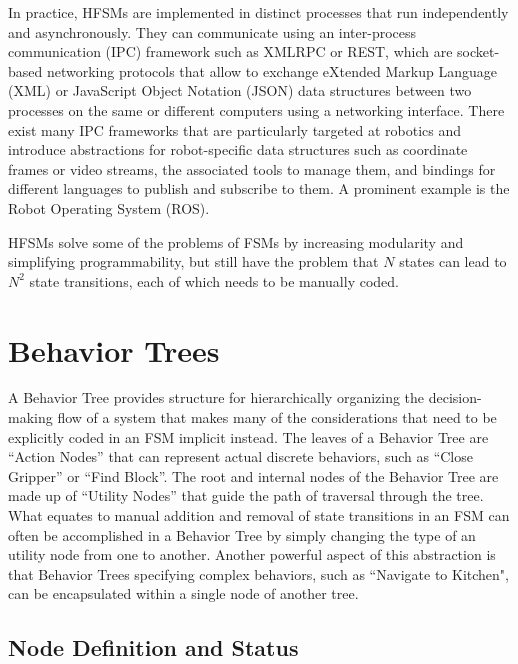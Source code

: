 In practice, HFSMs are implemented in distinct processes that run independently and asynchronously. They can communicate using an inter-process communication (IPC) framework  such as XMLRPC or REST, which are socket-based networking protocols that allow to exchange eXtended Markup Language (XML) or JavaScript Object Notation (JSON) data structures between two processes on the same or different computers using a networking interface.
%
There exist many IPC frameworks that are particularly targeted at robotics and introduce abstractions for robot-specific data structures such as coordinate frames or video streams, the associated tools to manage them, and bindings for different languages to publish and subscribe to them. A prominent example is the Robot Operating System (ROS).

HFSMs solve some of the problems of FSMs by increasing modularity and simplifying programmability, but still have the problem that $N$ states can lead to $N^2$ state transitions, each of which needs to be manually coded.

\section{Behavior Trees}\label{sec:behaviortrees}

A Behavior Tree \cite{colledanchise2018behavior} provides structure for hierarchically organizing the decision-making flow of a system that makes many of the considerations that need to be explicitly coded in an FSM implicit instead. The leaves of a Behavior Tree are ``Action Nodes'' that can represent actual discrete behaviors, such as ``Close Gripper'' or ``Find Block''. The root and internal nodes of the Behavior Tree are made up of ``Utility Nodes'' that guide the path of traversal through the tree.
What equates to manual addition and removal of state transitions in an FSM can often be accomplished in a Behavior Tree by simply changing the type of an utility node from one to another. Another powerful aspect of this abstraction is that Behavior Trees specifying complex behaviors, such as ``Navigate to Kitchen", can be encapsulated within a single node of another tree.

\subsection{Node Definition and Status}

